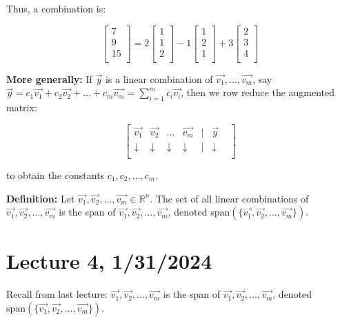 \documentclass{article}
\begin{document}
Thus, a combination is:

\[
\begin{bmatrix}
    7 \\
    9 \\
    15 \\
\end{bmatrix}
=
2 \begin{bmatrix}
    1 \\
    1 \\
    2 \\
\end{bmatrix}
-1 \begin{bmatrix}
    1 \\
    2 \\
    1 \\
\end{bmatrix}
+3 \begin{bmatrix}
    2 \\
    3 \\
    4 \\
\end{bmatrix}
\]


\textbf{More generally:} If \(\vec{y}\) is a linear combination of \(\vec{v_1}, \ldots, \vec{v_m}\), say \(\vec{y} = c_1\vec{v_1} + c_2\vec{v_2} + \ldots + c_m\vec{v_m} = \sum_{i=1}^{m} c_i\vec{v_i}\), then we row reduce the augmented matrix:

\[
\begin{bmatrix}
    \vec{v_1} & \vec{v_2} & \ldots & \vec{v_m} & | & \vec{y} \\
    \downarrow &  \downarrow &  \downarrow &  \downarrow & | & \downarrow & \\
\end{bmatrix}
\]

to obtain the constants \(c_1, c_2, \ldots, c_m\).

\textbf{Definition:} Let \(\vec{v_1}, \vec{v_2}, \ldots, \vec{v_m} \in \mathbb{R}^n\). The set of all linear combinations of \(\vec{v_1}, \vec{v_2}, \ldots, \vec{v_m}\) is the span of \(\vec{v_1}, \vec{v_2}, \ldots, \vec{v_m}\), denoted \(\text{span}(\{\vec{v_1}, \vec{v_2}, \ldots, \vec{v_m}\})\).


\section{Lecture 4, 1/31/2024}

Recall from last lecture: \(\vec{v_1}, \vec{v_2}, \ldots, \vec{v_m}\) is the span of \(\vec{v_1}, \vec{v_2}, \ldots, \vec{v_m}\), denoted \(\text{span}(\{\vec{v_1}, \vec{v_2}, \ldots, \vec{v_m}\})\).
\end{document}
